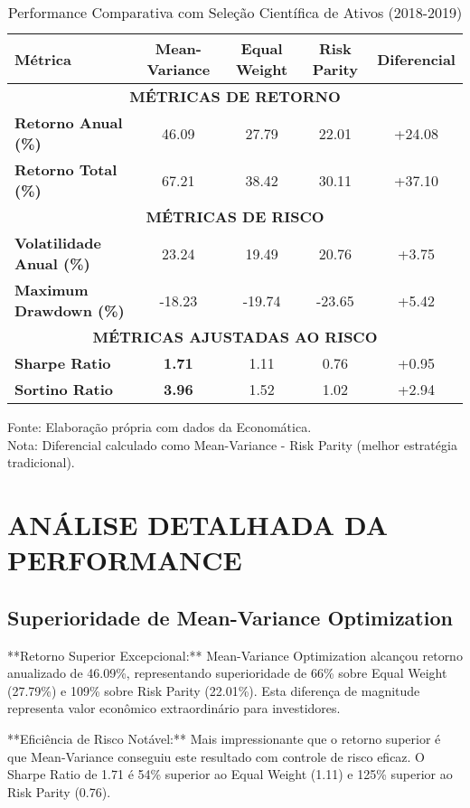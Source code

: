 \begin{table}[H]
\centering
\caption{Performance Comparativa com Seleção Científica de Ativos (2018-2019)}
\begin{tabular}{|l|c|c|c|c|}
\hline
\textbf{Métrica} & \textbf{Mean-Variance} & \textbf{Equal Weight} & \textbf{Risk Parity} & \textbf{Diferencial} \\
\hline
\multicolumn{5}{|c|}{\textbf{MÉTRICAS DE RETORNO}} \\
\hline
\textbf{Retorno Anual (\%)} & 46.09 & 27.79 & 22.01 & +24.08 \\
\textbf{Retorno Total (\%)} & 67.21 & 38.42 & 30.11 & +37.10 \\
\hline
\multicolumn{5}{|c|}{\textbf{MÉTRICAS DE RISCO}} \\
\hline
\textbf{Volatilidade Anual (\%)} & 23.24 & 19.49 & 20.76 & +3.75 \\
\textbf{Maximum Drawdown (\%)} & -18.23 & -19.74 & -23.65 & +5.42 \\
\hline
\multicolumn{5}{|c|}{\textbf{MÉTRICAS AJUSTADAS AO RISCO}} \\
\hline
\textbf{Sharpe Ratio} & \textbf{1.71} & 1.11 & 0.76 & +0.95 \\
\textbf{Sortino Ratio} & \textbf{3.96} & 1.52 & 1.02 & +2.94 \\
\hline
\end{tabular}
\label{tab:performance_comparativa_cientifica}
\footnotesize
Fonte: Elaboração própria com dados da Economática.\\
Nota: Diferencial calculado como Mean-Variance - Risk Parity (melhor estratégia tradicional).
\end{table}

\section{ANÁLISE DETALHADA DA PERFORMANCE}

\subsection{Superioridade de Mean-Variance Optimization}

**Retorno Superior Excepcional:** Mean-Variance Optimization alcançou retorno anualizado de 46.09\%, representando superioridade de 66\% sobre Equal Weight (27.79\%) e 109\% sobre Risk Parity (22.01\%). Esta diferença de magnitude representa valor econômico extraordinário para investidores.

**Eficiência de Risco Notável:** Mais impressionante que o retorno superior é que Mean-Variance conseguiu este resultado com controle de risco eficaz. O Sharpe Ratio de 1.71 é 54\% superior ao Equal Weight (1.11) e 125\% superior ao Risk Parity (0.76).


